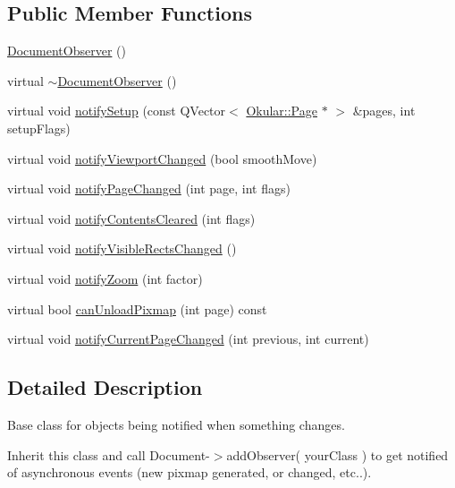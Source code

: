 \subsection*{Public Member Functions}
\begin{DoxyCompactItemize}
\item 
\hyperlink{classOkular_1_1DocumentObserver_a413aef62f11ee673feff12fb7968cd71}{Document\+Observer} ()
\item 
virtual \hyperlink{classOkular_1_1DocumentObserver_ae777e9e5f17925e2740c3d126336c6ff}{$\sim$\+Document\+Observer} ()
\item 
virtual void \hyperlink{classOkular_1_1DocumentObserver_a7218049f827538efc044558f9346c50a}{notify\+Setup} (const Q\+Vector$<$ \hyperlink{classOkular_1_1Page}{Okular\+::\+Page} $\ast$ $>$ \&pages, int setup\+Flags)
\item 
virtual void \hyperlink{classOkular_1_1DocumentObserver_ac98c9e8b62ec9261ed9c9ea2710849f0}{notify\+Viewport\+Changed} (bool smooth\+Move)
\item 
virtual void \hyperlink{classOkular_1_1DocumentObserver_abf7600dabd7d6c1e38c950d99f7be595}{notify\+Page\+Changed} (int page, int flags)
\item 
virtual void \hyperlink{classOkular_1_1DocumentObserver_ada5aff7f1944ccdf81526b8278ab5843}{notify\+Contents\+Cleared} (int flags)
\item 
virtual void \hyperlink{classOkular_1_1DocumentObserver_a6e528ff60565b4dd6da415a8f68bec14}{notify\+Visible\+Rects\+Changed} ()
\item 
virtual void \hyperlink{classOkular_1_1DocumentObserver_a3a233a300839943c68ba57a6c5d8f591}{notify\+Zoom} (int factor)
\item 
virtual bool \hyperlink{classOkular_1_1DocumentObserver_a6b294d9207a1546eb9fcb7b878d94f20}{can\+Unload\+Pixmap} (int page) const 
\item 
virtual void \hyperlink{classOkular_1_1DocumentObserver_ae449ca3f3f8aa7dffab61a6b723a1fd8}{notify\+Current\+Page\+Changed} (int previous, int current)
\end{DoxyCompactItemize}


\subsection{Detailed Description}
Base class for objects being notified when something changes. 

Inherit this class and call Document-\/$>$add\+Observer( your\+Class ) to get notified of asynchronous events (new pixmap generated, or changed, etc..). 

